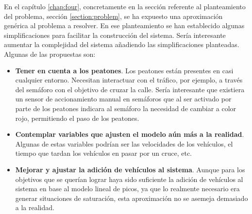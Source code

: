 En el capítulo \ref{chap:four}, concretamente en la sección referente al planteamiento del problema, sección \ref{section:problem}, se ha expuesto una aproximación genérica al problema a resolver. En ese planteamiento se han establecido algunas simplificaciones para facilitar la construcción del sistema. Sería interesante aumentar la complejidad del sistema añadiendo las simplificaciones planteadas. Algunas de las propuestas son:
\begin{itemize}
    \item \textbf{Tener en cuenta a los peatones}. Los peatones están presentes en casi cualquier entorno. Necesitan interactuar con el tráfico, por ejemplo, a través del semáforo con el objetivo de cruzar la calle. Sería interesante que existiera un sensor de accionamiento manual en semáforos que al ser activado por parte de los peatones indicara al semáforo la necesidad de cambiar a color rojo, permitiendo el paso de  los peatones.
    \item \textbf{Contemplar variables que ajusten el modelo aún más a la realidad}. Algunas de estas variables podrían ser las velocidades de los vehículos, el tiempo que tardan los vehículos en pasar por un cruce, etc.
    \item \textbf{Mejorar y ajustar la adición de vehículos al sistema}. Aunque para los objetivos que se querían lograr haya sido suficiente la adición de vehículos al sistema en base al modelo lineal de picos, ya que lo realmente necesario era generar situaciones de saturación, esta aproximación no se asemeja demasiado a la realidad.
\end{itemize}